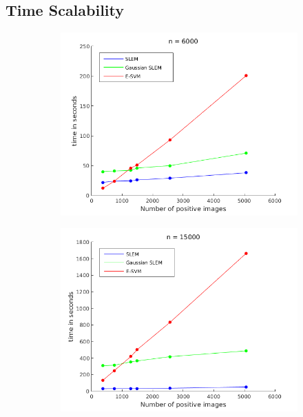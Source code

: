 \subsection{Time Scalability} \label{time-scale}
\begin{figure}[!h]
\centering
\begin{subfigure}[b]{0.32\textwidth}
\includegraphics[width=\textwidth]{speed_n_6K.png}
\end{subfigure}
\begin{subfigure}[b]{0.32\textwidth}
\includegraphics[width=\textwidth]{speed_n_15K.png}
\end{subfigure}
\begin{subfigure}[b]{0.32\textwidth}

\end{subfigure}
\end{figure}

